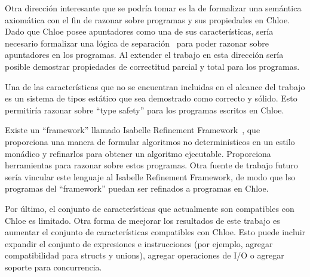 Otra dirección interesante que se podría tomar es la de formalizar una semántica axiomática con el fin de razonar sobre programas y sus propiedades en Chloe.
Dado que Chloe posee apuntadores como una de sus características, sería necesario formalizar una lógica de separación~\cite{sep-logic} para poder razonar sobre apuntadores en los programas.
Al extender el trabajo en esta dirección sería posible demostrar propiedades de correctitud parcial y total para los programas.

Una de las características que no se encuentran incluidas en el alcance del trabajo es un sistema de tipos estático que sea demostrado como correcto y sólido.
Esto permitiría razonar sobre ``type safety'' para los programas escritos en Chloe.

Existe un ``framework'' llamado Isabelle Refinement Framework~\cite{Refine_Monadic-AFP}, que proporciona una manera de formular algoritmos no deterministicos en un estilo monádico y refinarlos para obtener un algoritmo ejecutable.
Proporciona herramientas para razonar sobre estos programas.
Otra fuente de trabajo futuro sería vincular este lenguaje al Isabelle Refinement Framework, de modo que lso programas del ``framework'' puedan ser refinados a programas en Chloe.

Por último, el conjunto de características que actualmente son compatibles con Chloe es limitado.
Otra forma de meejorar los resultados de este trabajo es aumentar el conjunto de características compatibles con Chloe.
Esto puede incluir expandir el conjunto de expresiones e instrucciones (por ejemplo, agregar compatibilidad para structs y unions), agregar operaciones de I/O o agregar soporte para concurrencia.